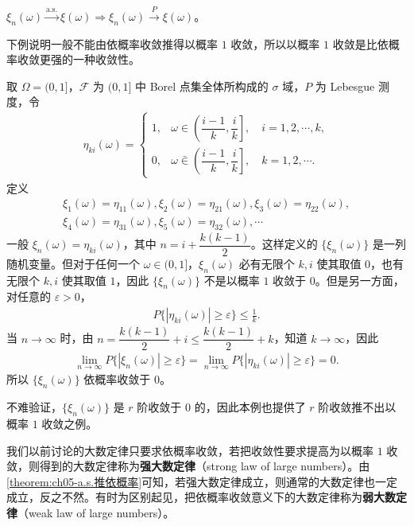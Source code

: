 \documentclass[../../main.tex]{subfiles}
\begin{document}
\begin{theorem}\label{theorem:ch05-a.s.推依概率}
$\xi_n(\omega)\xrightarrow{\mathrm{a.s.}}\xi(\omega)\Rightarrow\xi_n(\omega)\xrightarrow{P}\xi(\omega)$。
\end{theorem}

下例说明一般不能由依概率收敛推得以概率 $1$ 收敛，所以以概率 $1$ 收敛是比依概率收敛更强的一种收敛性。

\begin{example}\label{example:ch05-依概率不a.s.反例}
取 $\Omega=(0,1]$，$\mathscr{F}$ 为 $(0,1]$ 中 Borel 点集全体所构成的 $\sigma$ 域，$P$ 为 Lebesgue 测度，令
\begin{align}
\eta_{ki}(\omega)=
\begin{cases}
1,&\omega\in\left(\dfrac{i-1}{k},\dfrac{i}{k}\right],\quad i=1,2,\cdots,k,\\
0,&\omega\bar{\in}\left(\dfrac{i-1}{k},\dfrac{i}{k}\right],\quad k=1,2,\cdots.
\end{cases}
\end{align}
定义
\begin{align*}
\xi_1(\omega)=\eta_{11}(\omega),\xi_2(\omega)=\eta_{21}(\omega),\xi_3(\omega)=\eta_{22}(\omega),\\
\xi_4(\omega)=\eta_{31}(\omega),\xi_5(\omega)=\eta_{32}(\omega),\cdots
\end{align*}
一般 $\xi_n(\omega)=\eta_{ki}(\omega)$，其中 $n=i+\dfrac{k(k-1)}2$。这样定义的 $\{\xi_n(\omega)\}$ 是一列随机变量。但对于任何一个 $\omega\in(0,1]$，$\xi_n(\omega)$ 必有无限个 $k,i$ 使其取值 $0$，也有无限个 $k,i$ 使其取值 $1$，因此 $\{\xi_n(\omega)\}$ 不是以概率 $1$ 收敛于 $0$。但是另一方面，对任意的 $\varepsilon>0$，
\begin{align*}
P\{|\eta_{ki}(\omega)|\geqslant\varepsilon\}\leqslant\frac1k.
\end{align*}
当 $n\to\infty$ 时，由 $n=\dfrac{k(k-1)}2+i\leqslant\dfrac{k(k-1)}2+k$，知道 $k\to\infty$，因此
\begin{align*}
\lim_{n\to\infty}P\{|\xi_n(\omega)|\geqslant\varepsilon\}
=\lim_{n\to\infty}P\{|\eta_{ki}(\omega)|\geqslant\varepsilon\}=0.
\end{align*}
所以 $\{\xi_n(\omega)\}$ 依概率收敛于 $0$。

不难验证，$\{\xi_n(\omega)\}$ 是 $r$ 阶收敛于 $0$ 的，因此本例也提供了 $r$ 阶收敛推不出以概率 $1$ 收敛之例。
\end{example}

我们以前讨论的大数定律只要求依概率收敛，若把收敛性要求提高为以概率 $1$ 收敛，则得到的大数定律称为\textbf{强大数定律}（strong law of large numbers）。由\cref{theorem:ch05-a.s.推依概率}可知，若强大数定律成立，则通常的大数定律也一定成立，反之不然。有时为区别起见，把依概率收敛意义下的大数定律称为\textbf{弱大数定律}（weak law of large numbers）。
\end{document}
